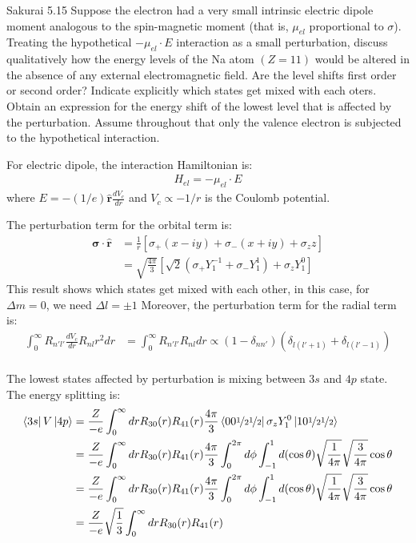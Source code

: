 \documentclass{article}
\newcommand{\bs}{\boldsymbol}
\begin{document}
	\newpage
	\begin{section}{Sakurai 5.15}
		Suppose the electron had a very small intrinsic electric dipole moment analogous to the spin-magnetic moment (that is, $\mu_{el}$ proportional to $\sigma$). Treating the hypothetical $-\mu_{el} \cdot E$ interaction as a small perturbation, discuss qualitatively how the energy levels of the Na atom $(Z = 11)$ would be altered in the absence of any external electromagnetic field. Are the level shifts first order or second order? Indicate explicitly which states get mixed with each oters. Obtain an expression for the energy shift of the lowest level that is affected by the perturbation. Assume throughout that only the valence electron is subjected to the hypothetical interaction.

		\begin{tcolorbox}[breakable]
			For electric dipole, the interaction Hamiltonian is:
			\begin{align*}
				H_{el} = -\mu_{el} \cdot E
			\end{align*}
			where $E = -(1/e)\hat{\bs{r}} \frac{dV_c}{dr}$ and $V_c \propto -1/r$ is the Coulomb potential. 
			
			The perturbation term for the orbital term is:
			\begin{align*}
				\bs{\sigma} \cdot \hat{\bs{r}} &= \frac{1}{r} \left[ \sigma_+ (x-iy) + \sigma_- (x+iy) + \sigma_z z \right] \\
				&= \sqrt{\frac{4\pi}{3}} \left[ \sqrt{2} (\sigma_+ Y_1^{-1} + \sigma_- Y_1^1) + \sigma_z Y_1^0 \right] 
			\end{align*}
			This result shows which states get mixed with each other, in this case, for $\Delta m = 0$, we need $\Delta l = \pm 1$
			Moreover, the perturbation term for the radial term is:
			\begin{align*}
				\int_0^\infty R_{n'l'} \frac{dV_c}{dr} R_{nl} r^2 dr &= \int_0^\infty R_{n'l'} R_{nl} dr \propto (1 - \delta_{nn'})(\delta_{l(l'+1)} + \delta_{l(l'-1)}) \\
			\end{align*}

			The lowest states affected by perturbation is mixing between $3s$ and $4p$ state. The energy  splitting is:
			\begin{align*}
				\bra{3s} V \ket{4p} 
				&= \frac{Z}{-e} \int_0^\infty dr R_{30}(r) R_{41}(r) \frac{4\pi}{3} \bra{00\nicefrac{1}{2}\nicefrac{1}{2}} \sigma_z Y_1^0 \ket{10\nicefrac{1}{2}\nicefrac{1}{2}}\\
				&= \frac{Z}{-e} \int_0^\infty dr R_{30}(r) R_{41}(r) \frac{4\pi}{3} \int_0^{2\pi} d\phi \int_{-1}^1 d(\cos \theta) \sqrt{\frac{1}{4\pi}} \sqrt{\frac{3}{4\pi}} \cos\theta \\
				&= \frac{Z}{-e} \int_0^\infty dr R_{30}(r) R_{41}(r) \frac{4\pi}{3} \int_0^{2\pi} d\phi \int_{-1}^1 d(\cos \theta) \sqrt{\frac{1}{4\pi}} \sqrt{\frac{3}{4\pi}} \cos\theta \\
				&= \frac{Z}{-e} \sqrt{\frac{1}{3}} \int_0^\infty dr R_{30}(r) R_{41}(r)
			\end{align*}


\end{tcolorbox}
\end{section}
\end{document}
